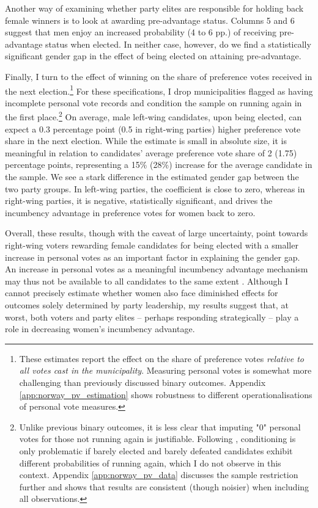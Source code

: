 \documentclass[12pt]{article}
\begin{document}
Another way of examining whether party elites are responsible for holding back female winners is to look at awarding pre-advantage status. Columns 5 and 6 suggest that men enjoy an increased probability (4 to 6 pp.) of receiving pre-advantage status when elected. In neither case, however, do we find a statistically significant gender gap in the effect of being elected on attaining pre-advantage.

Finally, I turn to the effect of winning on the share of preference votes received in the next election.\footnote{\label{fn:pv_robust}These estimates report the effect on the share of preference votes \emph{relative to all votes cast in the municipality}. Measuring personal votes is somewhat more challenging than previously discussed binary outcomes.
Appendix \ref{app:norway_pv_estimation} shows robustness to different operationalisations of personal vote measures.} For these specifications, I drop municipalities flagged as having incomplete personal vote records and condition the sample on running again in the first place.\footnote{
    Unlike previous binary outcomes, it is less clear that imputing "0" personal votes for those not running again is justifiable. Following \citet{demagalhaes2015}, conditioning is only problematic if barely elected and barely defeated candidates exhibit different probabilities of running again, which I do not observe in this context. Appendix \ref{app:norway_pv_data} discusses the sample restriction further and shows that results are consistent (though noisier) when including all observations.
} On average, male left-wing candidates, upon being elected, can expect a 0.3 percentage point (0.5 in right-wing parties) higher preference vote share in the next election. While the estimate is small in absolute size, it is meaningful in relation to candidates' average preference vote share of 2 (1.75) percentage points, representing a 15\% (28\%) increase for the average candidate in the sample. We see a stark difference in the estimated gender gap between the two party groups. In left-wing parties, the coefficient is close to zero, whereas in right-wing parties, it is negative, statistically significant, and drives the incumbency advantage in preference votes for women back to zero.

Overall, these results, though with the caveat of large uncertainty, point towards right-wing voters rewarding female candidates for being elected with a smaller increase in personal votes as an important factor in explaining the gender gap. An increase in personal votes as a meaningful incumbency advantage mechanism may thus not be available to all candidates to the same extent \citep{fiva2018a}. Although I cannot precisely estimate whether women also face diminished effects for outcomes solely determined by party leadership, my results suggest that, at worst, both voters and party elites -- perhaps responding strategically -- play a role in decreasing women's incumbency advantage.
\end{document}
